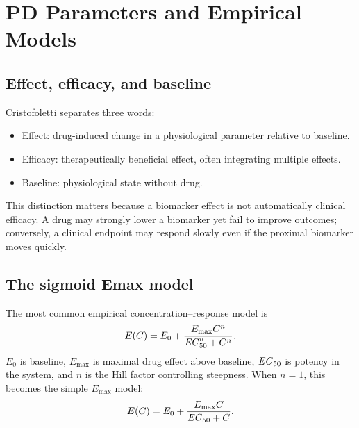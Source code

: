 \documentclass[a4paper]{article}
\renewcommand{\Emax}{\ensuremath{E_{\max}}}
\renewcommand{\ECfifty}{\ensuremath{\pksym{EC}_{50}}}
\begin{document}
\section{PD Parameters and Empirical Models}

\subsection{Effect, efficacy, and baseline}

Cristofoletti separates three words:
\begin{itemize}[leftmargin=2em]
  \item Effect: drug-induced change in a physiological parameter relative to baseline.
  \item Efficacy: therapeutically beneficial effect, often integrating multiple effects.
  \item Baseline: physiological state without drug.
\end{itemize}
This distinction matters because a biomarker effect is not automatically clinical efficacy. A drug may strongly lower a biomarker yet fail to improve outcomes; conversely, a clinical endpoint may respond slowly even if the proximal biomarker moves quickly.

\subsection{The sigmoid Emax model}

The most common empirical concentration--response model is
\[
  E(C)
  =
  E_0
  +
  \frac{\Emax{} C^n}{\ECfifty^n+C^n}.
\]
\(E_0\) is baseline, \(\Emax\) is maximal drug effect above baseline, \(\ECfifty\) is potency in the system, and \(n\) is the Hill factor controlling steepness. When \(n=1\), this becomes the simple \(\Emax\) model:
\[
  E(C)=E_0+\frac{\Emax{} C}{\ECfifty+C}.
\]
\end{document}
